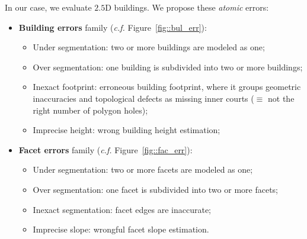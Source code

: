 \documentclass[runningheads]{llncs}
\begin{document}
In our case, we evaluate $2.5$D buildings. We propose these \textit{atomic} errors:
	\begin{itemize}
		\item \textbf{Building errors} family (\textit{c.f.} Figure~\ref{fig::bul_err}):
        \begin{itemize}
        	\item Under segmentation: two or more buildings are modeled as one;
            \item Over segmentation: one building is subdivided into two or more buildings;
            \item Inexact footprint: erroneous building footprint, where it groups geometric inaccuracies and topological defects as missing inner courts ($\equiv$ not the right number of polygon holes);
            \item Imprecise height: wrong building height estimation;
        \end{itemize}
		\item \textbf{Facet errors} family (\textit{c.f.} Figure~\ref{fig::fac_err}):
        \begin{itemize}
        	\item Under segmentation: two or more facets are modeled as one;
            \item Over segmentation: one facet is subdivided into two or more facets;
            \item Inexact segmentation: facet edges are inaccurate;
            \item Imprecise slope: wrongful facet slope estimation.
        \end{itemize}
	\end{itemize}
\end{document}
